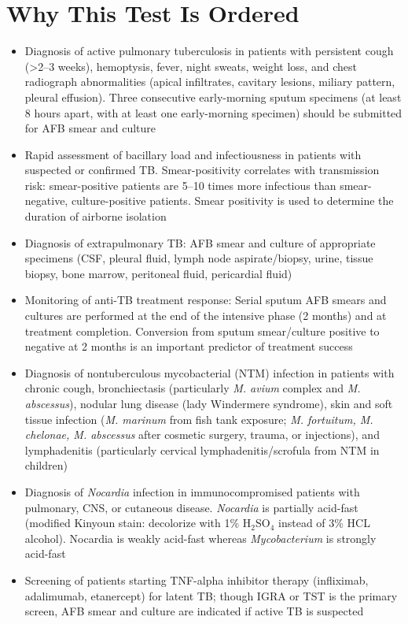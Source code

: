 \section*{Why This Test Is Ordered}
\begin{itemize}
  \item Diagnosis of active pulmonary tuberculosis in patients with persistent cough (>2--3 weeks), hemoptysis, fever, night sweats, weight loss, and chest radiograph abnormalities (apical infiltrates, cavitary lesions, miliary pattern, pleural effusion). Three consecutive early-morning sputum specimens (at least 8 hours apart, with at least one early-morning specimen) should be submitted for AFB smear and culture
  \item Rapid assessment of bacillary load and infectiousness in patients with suspected or confirmed TB. Smear-positivity correlates with transmission risk: smear-positive patients are 5--10 times more infectious than smear-negative, culture-positive patients. Smear positivity is used to determine the duration of airborne isolation
  \item Diagnosis of extrapulmonary TB: AFB smear and culture of appropriate specimens (CSF, pleural fluid, lymph node aspirate/biopsy, urine, tissue biopsy, bone marrow, peritoneal fluid, pericardial fluid)
  \item Monitoring of anti-TB treatment response: Serial sputum AFB smears and cultures are performed at the end of the intensive phase (2 months) and at treatment completion. Conversion from sputum smear/culture positive to negative at 2 months is an important predictor of treatment success
  \item Diagnosis of nontuberculous mycobacterial (NTM) infection in patients with chronic cough, bronchiectasis (particularly \textit{M. avium} complex and \textit{M. abscessus}), nodular lung disease (lady Windermere syndrome), skin and soft tissue infection (\textit{M. marinum} from fish tank exposure; \textit{M. fortuitum, M. chelonae, M. abscessus} after cosmetic surgery, trauma, or injections), and lymphadenitis (particularly cervical lymphadenitis/scrofula from NTM in children)
  \item Diagnosis of \textit{Nocardia} infection in immunocompromised patients with pulmonary, CNS, or cutaneous disease. \textit{Nocardia} is partially acid-fast (modified Kinyoun stain: decolorize with 1\% H$_2$SO$_4$ instead of 3\% HCL alcohol). Nocardia is weakly acid-fast whereas \textit{Mycobacterium} is strongly acid-fast
  \item Screening of patients starting TNF-alpha inhibitor therapy (infliximab, adalimumab, etanercept) for latent TB; though IGRA or TST is the primary screen, AFB smear and culture are indicated if active TB is suspected
\end{itemize}


